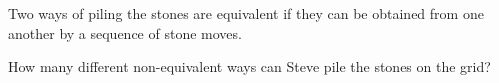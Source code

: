 \begin{enumerate}
 Two ways of piling the stones are equivalent if they can be obtained from one another by a sequence of stone moves.


 How many different non-equivalent ways can Steve pile the stones on the grid?


 

\end{enumerate}